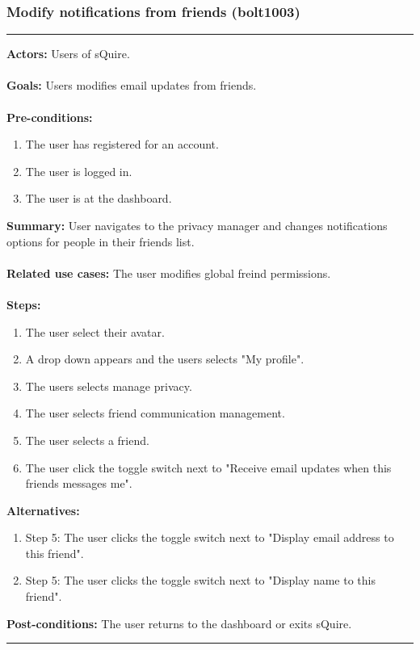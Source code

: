 \documentclass[11pt]{report}
\begin{document}
\subsubsection{Modify notifications from friends (bolt1003)}
\vspace{2pt}
\hrule
\vspace{8pt}
 \textbf{Actors:} Users of sQuire. \\ \\
\textbf{Goals:} Users modifies email updates from friends. \\ \\
 \textbf{Pre-conditions:} \begin{enumerate}
  \item The user has registered for an account.
  \item The user is logged in.
  \item The user is at the dashboard.
 \end{enumerate}
 \textbf{Summary:} User navigates to the privacy manager and changes notifications options for people in their friends list.\\ \\
\textbf{Related use cases:} The user modifies global freind permissions. \\ \\
\textbf{Steps:} \begin{enumerate}
  \item The user select their avatar.
  \item A drop down appears and the users selects "My profile".
  \item The users selects manage privacy.
  \item The user selects friend communication management.
  \item The user selects a friend.
  \item The user click the toggle switch next to "Receive email updates when this friends messages me".
 \end{enumerate}
 \textbf{Alternatives:} \begin{enumerate} 
  \item Step 5: The user clicks the toggle switch next to "Display email address to this friend".
  \item Step 5: The user clicks the toggle switch next to "Display name to this friend".
 \end{enumerate}
 \textbf{Post-conditions:} The user returns to the dashboard or exits sQuire. \\
\vspace{8pt}
\hrule
\newpage
\end{document}
